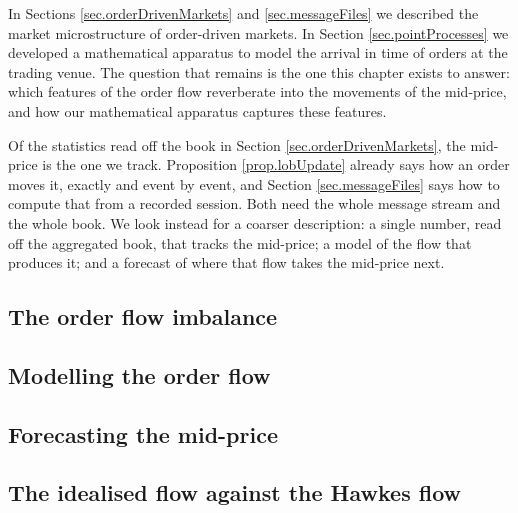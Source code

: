 In Sections \ref{sec.orderDrivenMarkets} and \ref{sec.messageFiles}
we described the market microstructure of order-driven markets.
In Section \ref{sec.pointProcesses}
we developed a mathematical apparatus to model
the arrival in time of orders at the trading venue.
The question that remains is the one this chapter exists to answer:
which features of the order flow reverberate into the movements of the mid-price,
and how our mathematical apparatus captures these features.

Of the statistics read off the book in Section \ref{sec.orderDrivenMarkets},
the mid-price is the one we track.
Proposition \ref{prop.lobUpdate} already says how an order moves it,
exactly and event by event,
and Section \ref{sec.messageFiles} says how to compute that from a recorded session.
Both need the whole message stream and the whole book.
We look instead for a coarser description:
a single number, read off the aggregated book, that tracks the mid-price;
a model of the flow that produces it;
and a forecast of where that flow takes the mid-price next.

\subsection{The order flow imbalance}
\label{sec.orderFlowImbalance}


\subsection{Modelling the order flow}
\label{sec.orderFlowModel}


\subsection{Forecasting the mid-price}
\label{sec.forecastingTheMid}


\subsection{The idealised flow against the Hawkes flow}
\label{sec.idealisedAgainstHawkes}

